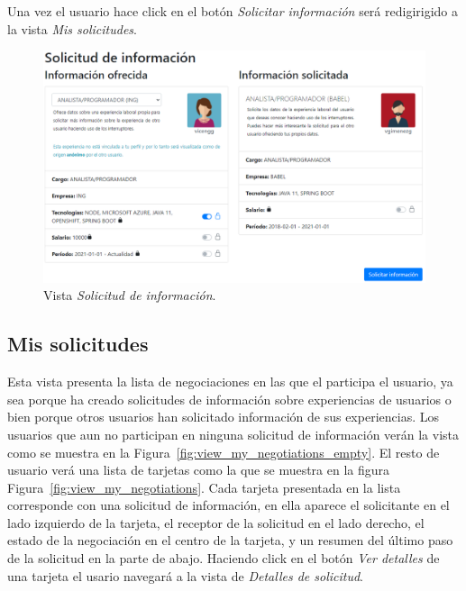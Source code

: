 \documentclass[a4paper, 12pt]{book}
\begin{document}
    Una vez el usuario hace click en el botón \emph{Solicitar información} será redigirigido a la vista \emph{Mis solicitudes}.

    \begin{figure}
        \centering
        \includegraphics[width=15cm, keepaspectratio]{img/negotiate_we.PNG}
        \caption{Vista \emph{Solicitud de información}.}\label{fig:view_create_negotiation}
    \end{figure}

    \subsection{Mis solicitudes}
    \label{subsec:view_my_negotiations}
    Esta vista presenta la lista de negociaciones en las que el participa el usuario, ya sea porque ha creado solicitudes de información sobre experiencias de usuarios o bien porque otros usuarios han solicitado información de sus experiencias.
    Los usuarios que aun no participan en ninguna solicitud de información verán la vista como se muestra en la Figura~\ref{fig:view_my_negotiations_empty}.
    El resto de usuario verá una lista de tarjetas como la que se muestra en la figura Figura~\ref{fig:view_my_negotiations}.
    Cada tarjeta presentada en la lista corresponde con una solicitud de información, en ella aparece el solicitante en el lado izquierdo de la tarjeta, el receptor de la solicitud en el lado derecho, el estado de la negociación en el centro de la tarjeta, y un resumen del último paso de la solicitud en la parte de abajo.
    Haciendo click en el botón \emph{Ver detalles} de una tarjeta el usario navegará a la vista de \emph{Detalles de solicitud}.
\end{document}
